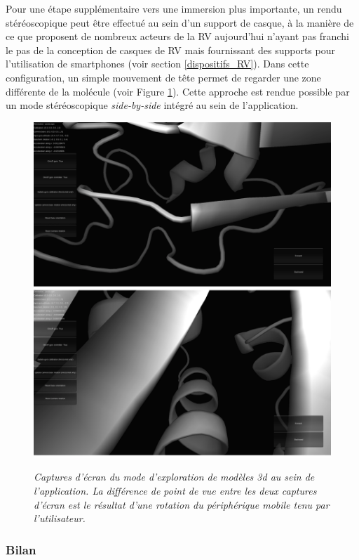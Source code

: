 Pour une étape supplémentaire vers une immersion plus importante, un rendu stéréoscopique peut être effectué au sein d'un support de casque, à la manière de ce que proposent de nombreux acteurs de la RV aujourd'hui n'ayant pas franchi le pas de la conception de casques de RV mais fournissant des supports pour l'utilisation de smartphones (voir section \ref{dispositifs_RV}). Dans cette configuration, un simple mouvement de tête permet de regarder une zone différente de la molécule (voir Figure \ref{Fig:molexplorer_screenshot}). Cette approche est rendue possible par un mode stéréoscopique \textit{side-by-side} intégré au sein de l'application. 

\begin{figure}[h]
  \centering
  {\includegraphics[width=.75\linewidth]{./figures/ch3/molexplorer_screenshot.png}}
    \caption[Captures d'écran du mode d'exploration de modèles 3d au sein de l'application.]{{\it Captures d'écran du mode d'exploration de modèles 3d au sein de l'application. La différence de point de vue entre les deux captures d'écran est le résultat d'une rotation du périphérique mobile tenu par l'utilisateur.}}
  \label{Fig:molexplorer_screenshot}
\end{figure}

\subsubsection{Bilan}

